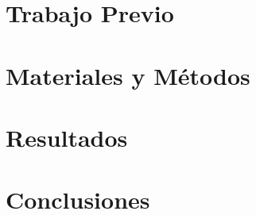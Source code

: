 \documentclass{beamer}
\title{\tituloTesis}
\author{Juan Manuel Pérez}
\begin{document}
\beamertemplatenavigationsymbolsempty



\frame{\titlepage}





\section{Trabajo Previo}




\section{Materiales y Métodos}


\section{Resultados}


\section{Conclusiones}

\end{document}

